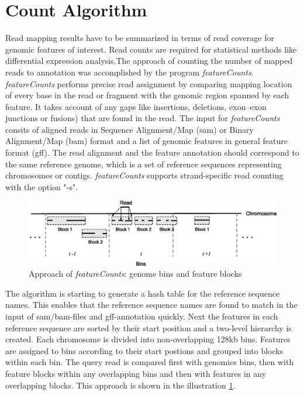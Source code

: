 \documentclass[12pt, a4paper]{report}
\begin{document}
\section{Count Algorithm}\label{featurecount}
Read mapping results have to be summarized in terms of read coverage for genomic features of interest. Read counts are required for statistical methods like differential expression analysis.The approach of counting the number of mapped reads to annotation was accomplished by the program \textit{featureCounts}. \\
\textit{featureCounts} performs precise read assignment by comparing mapping location of every base in the read or fragment with the genomic region spanned by each feature. It takes account of any gaps like insertions, deletions, exon–exon junctions or fusions) that are found in the read. 
The input for \textit{featureCounts} consits of aligned reads in Sequence Alignment/Map (sam) or Binary Alignment/Map (bam) format and a list of genomic features in general feature format (gff). The read alignment and the feature annotation should correspond to the same reference genome, which is a set of reference sequences representing chromosomes or contigs. \textit{featureCounts} supports strand-specific read counting with the option "-s". 
\begin{figure}[ht]
	\centering	
	\includegraphics[width=400pt]{pics/featurecounts}
	\caption[Approach of software \textit{featureCounts}]
	{Approach of \textit{featureCounts}: genome bins and feature blocks \cite{Liao2014} }
	\label{fig:featurecounts}
\end{figure}

The algorithm is starting to generate a hash table for the reference sequence names. This enables that the reference sequence names are found to match in the input of sam/bam-files and gff-annotation quickly. Next the features in each reference sequence are sorted by their start position and a two-level hierarchy is created. Each chromosome is divided into non-overlapping 128kb bins. Features are assigned to bins according to their start postions and grouped into blocks within each bin. The query read is compared first with genomics bins, then with feature blocks within any overlapping bins and then with features in any overlapping blocks. This approach is shown in the illustration \ref{fig:featurecounts}. \cite{Liao2014}
\end{document}
